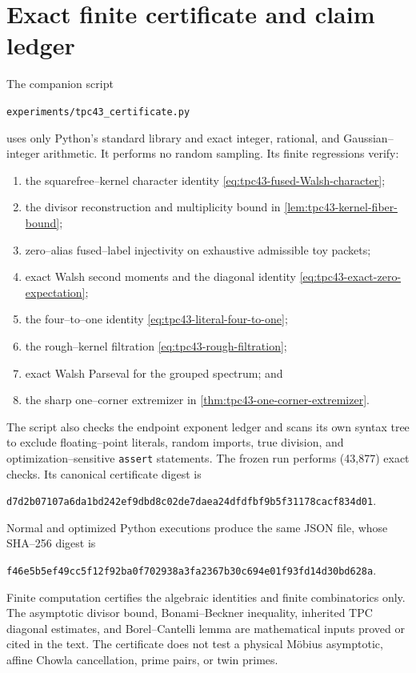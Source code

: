 \section{Exact finite certificate and claim ledger}
\label{sec:tpc43-certificate}

The companion script
\begin{center}
\texttt{experiments/tpc43\_certificate.py}
\end{center}
uses only Python's standard library and exact integer, rational, and
Gaussian--integer arithmetic.  It performs no random sampling.  Its
finite regressions verify:
\begin{enumerate}[label=(\roman*)]
 \item the squarefree--kernel character identity
 \eqref{eq:tpc43-fused-Walsh-character};
 \item the divisor reconstruction and multiplicity bound in
 \cref{lem:tpc43-kernel-fiber-bound};
 \item zero--alias fused--label injectivity on exhaustive admissible toy
 packets;
 \item exact Walsh second moments and the diagonal identity
 \eqref{eq:tpc43-exact-zero-expectation};
 \item the four--to--one identity
 \eqref{eq:tpc43-literal-four-to-one};
 \item the rough--kernel filtration
 \eqref{eq:tpc43-rough-filtration};
 \item exact Walsh Parseval for the grouped spectrum; and
 \item the sharp one--corner extremizer in
 \cref{thm:tpc43-one-corner-extremizer}.
\end{enumerate}
The script also checks the endpoint exponent ledger and scans its own
syntax tree to exclude floating--point literals, random imports, true
division, and optimization--sensitive \texttt{assert} statements.
The frozen run performs (43{,}877) exact checks.  Its canonical
certificate digest is
\begin{center}
\texttt{d7d2b07107a6da1bd242ef9dbd8c02de7daea24dfdfbf9b5f31178cacf834d01}.
\end{center}
Normal and optimized Python executions produce the same JSON file, whose
SHA--256 digest is
\begin{center}
\texttt{f46e5b5ef49cc5f12f92ba0f702938a3fa2367b30c694e01f93fd14d30bd628a}.
\end{center}

Finite computation certifies the algebraic identities and finite
combinatorics only.  The asymptotic divisor bound, Bonami--Beckner
inequality, inherited TPC diagonal estimates, and Borel--Cantelli lemma
are mathematical inputs proved or cited in the text.  The certificate
does not test a physical M\"obius asymptotic, affine Chowla cancellation,
prime pairs, or twin primes.
